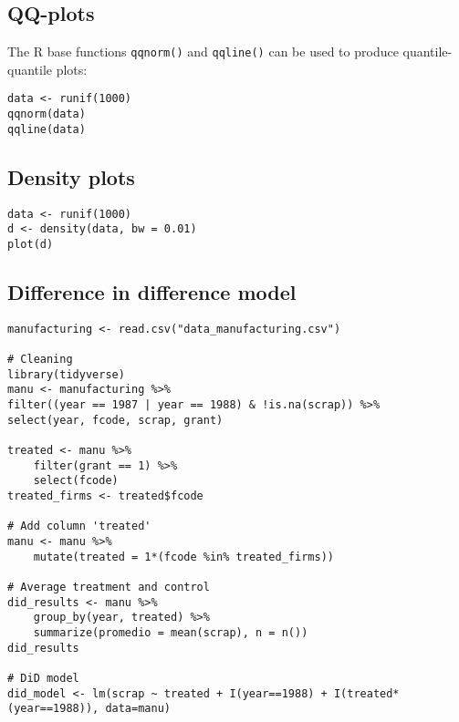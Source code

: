 \subsection{QQ-plots}
The R base functions \lstinline{qqnorm()} and \lstinline{qqline()} can be used to produce quantile-quantile plots:
\begin{lstlisting}
data <- runif(1000)
qqnorm(data)
qqline(data)
\end{lstlisting}

\subsection{Density plots}
\begin{lstlisting}
data <- runif(1000)
d <- density(data, bw = 0.01)
plot(d)
\end{lstlisting}


\subsection{Difference in difference model}
\begin{lstlisting}
manufacturing <- read.csv("data_manufacturing.csv")

# Cleaning
library(tidyverse)
manu <- manufacturing %>% 
filter((year == 1987 | year == 1988) & !is.na(scrap)) %>%
select(year, fcode, scrap, grant)

treated <- manu %>%
    filter(grant == 1) %>%
    select(fcode)
treated_firms <- treated$fcode

# Add column 'treated'
manu <- manu %>%
    mutate(treated = 1*(fcode %in% treated_firms))

# Average treatment and control 
did_results <- manu %>%
    group_by(year, treated) %>%
    summarize(promedio = mean(scrap), n = n())
did_results

# DiD model
did_model <- lm(scrap ~ treated + I(year==1988) + I(treated*(year==1988)), data=manu)
\end{lstlisting}


